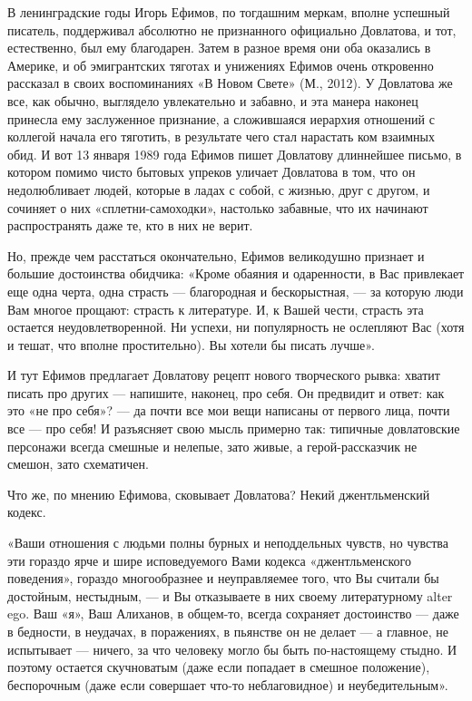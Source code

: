 В ленинградские годы Игорь Ефимов, по тогдашним меркам, вполне успешный
писатель, поддерживал абсолютно не признанного официально Довлатова, и тот,
естественно, был ему благодарен. Затем в разное время они оба оказались в
Америке, и об эмигрантских тяготах и унижениях Ефимов очень откровенно
рассказал в своих воспоминаниях «В Новом Свете» (М., 2012). У Довлатова же все,
как обычно, выглядело увлекательно и забавно, и эта манера наконец принесла ему
заслуженное признание, а сложившаяся иерархия отношений с коллегой начала его
тяготить, в результате чего стал нарастать ком взаимных обид. И вот 13 января
1989 года Ефимов пишет Довлатову длиннейшее письмо, в котором помимо чисто
бытовых упреков уличает Довлатова в том, что он недолюбливает людей, которые в
ладах с собой, с жизнью, друг с другом, и сочиняет о них «сплетни-самоходки»,
настолько забавные, что их начинают распространять даже те, кто в них не верит.

Но, прежде чем расстаться окончательно, Ефимов великодушно признает и большие
достоинства обидчика: «Кроме обаяния и одаренности, в Вас привлекает еще одна
черта, одна страсть — благородная и бескорыстная, — за которую люди Вам многое
прощают: страсть к литературе. И, к Вашей чести, страсть эта остается
неудовлетворенной. Ни успехи, ни популярность не ослепляют Вас (хотя и тешат,
что вполне простительно). Вы хотели бы писать лучше». 

И тут Ефимов предлагает Довлатову рецепт нового творческого рывка: хватит
писать про других — напишите, наконец, про себя. Он предвидит и ответ: как это
«не про себя»? — да почти все мои вещи написаны от первого лица, почти все —
про себя! И разъясняет свою мысль примерно так: типичные довлатовские персонажи
всегда смешные и нелепые, зато живые, а герой-рассказчик не смешон, зато
схематичен.

Что же, по мнению Ефимова, сковывает Довлатова? Некий джентльменский кодекс.

«Ваши отношения с людьми полны бурных и неподдельных чувств, но чувства эти
гораздо ярче и шире исповедуемого Вами кодекса «джентльменского поведения»,
гораздо многообразнее и неуправляемее того, что Вы считали бы достойным,
нестыдным, — и Вы отказываете в них своему литературному alter ego. Ваш «я»,
Ваш Алиханов, в общем-то, всегда сохраняет достоинство — даже в бедности, в
неудачах, в поражениях, в пьянстве он не делает — а главное, не испытывает —
ничего, за что человеку могло бы быть по-настоящему стыдно. И поэтому остается
скучноватым (даже если попадает в смешное положение), беспорочным (даже если
совершает что-то неблаговидное) и неубедительным». 

